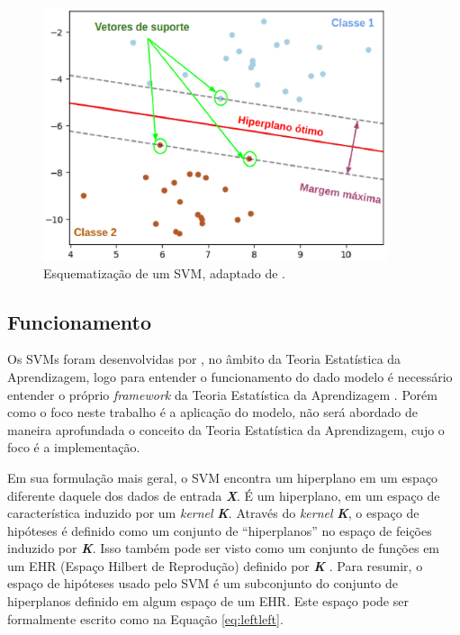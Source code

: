  \begin{figure}[!htb]
     \centering
     \includegraphics[width=0.9\textwidth]{figuras/svm_hiperplano.eps}
     \caption{Esquematização de um SVM, adaptado de .}
     \label{svm_hiperplano}
 \end{figure}

 \subsection{Funcionamento}

Os SVMs foram desenvolvidas por , no âmbito da Teoria Estatística da Aprendizagem, logo para entender o funcionamento do dado modelo é necessário entender o próprio \textit{framework} da Teoria Estatística da Aprendizagem \cite{vapnik1998statistical}. Porém como o foco neste trabalho é a aplicação do modelo, não será abordado de maneira aprofundada o conceito da Teoria Estatística da Aprendizagem, cujo o foco é a implementação.
 

Em sua formulação mais geral, o SVM encontra um hiperplano em um espaço diferente daquele dos dados de entrada \textbf{\textit{X}}. É um hiperplano, em um espaço de característica induzido por um  \textit{kernel} \textbf{\textit{K}}. Através do  \textit{kernel} \textbf{\textit{K}}, o espaço de hipóteses é definido como um conjunto de  “hiperplanos” no espaço de feições induzido por \textbf{\textit{K}}. Isso também pode ser visto como um conjunto de funções em um EHR (Espaço Hilbert de Reprodução) definido por \textbf{\textit{K}} \cite{wahba1990spline} \cite{vapnik1998statistical}. Para resumir, o espaço de hipóteses usado pelo SVM é um subconjunto do conjunto de hiperplanos definido em algum espaço de um EHR. Este espaço pode ser formalmente escrito como na Equação \ref{eq:leftleft}.


